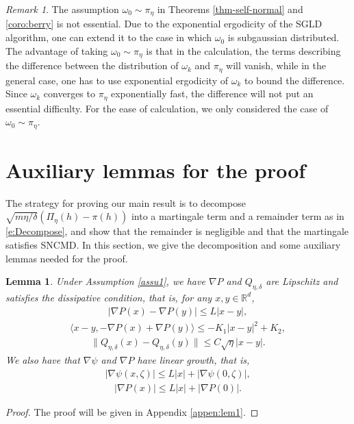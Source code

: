 \documentclass[12pt]{amsart}
\newtheorem{lemma}[theorem]{Lemma}
\theoremstyle{definition}
\theoremstyle{remark}
\newtheorem{remark}[theorem]{Remark}
\numberwithin{equation}{section}
\newcommand{\Ll}{\langle}
\newcommand{\Rr}{\rangle}
\newcommand{\R}{\mathbb{R}}\newcommand{\RR}{\mathbb{R}}
\begin{document}
\begin{remark}
The assumption $\omega_0\sim\pi_\eta$ in Theorems \ref{thm-self-normal} and \ref{coro:berry} is not essential. Due to the exponential ergodicity of the SGLD algorithm, one can extend it to the case in which $\omega_0$ is subgaussian distributed. The advantage of taking $\omega_0\sim\pi_\eta$ is that in the calculation, the terms describing the difference between the distribution of $\omega_k$ and $\pi_\eta$ will vanish, while in the general case, one has to use exponential ergodicity of $\omega_k$ to bound the difference. Since $\omega_k$ converges to $\pi_\eta$ exponentially fast, the difference will not put an essential difficulty. For the ease of calculation, we only considered the case of $\omega_0\sim\pi_\eta$.
\end{remark}



\section{Auxiliary lemmas for the proof}\label{sec:3}

The strategy for proving our main result is to decompose $\sqrt{m\eta/\delta}(\Pi_\eta(h)-\pi(h))$ into a martingale term and a remainder term as in \eqref{e:Decompose}, and show that the remainder is negligible and that the martingale satisfies SNCMD. In this section, we give the decomposition and some auxiliary lemmas needed for the proof. 



\begin{lemma}\label{lem:1} 
	Under Assumption \ref{assu1}, we have $\nabla P$ and $Q_{\eta,\delta}$ are Lipschitz and satisfies the dissipative condition, that is,  for any $x,y\in \R^d$,
		\begin{eqnarray}\label{e:plip}
		|\nabla P(x)-\nabla P(y)|\le L|x-y|,
	\end{eqnarray}
	\begin{eqnarray}\label{e:pdissi}
		\Ll x-y,-\nabla P(x)+\nabla P(y)\Rr\le -K_1|x-y|^2+K_2,
	\end{eqnarray}
	\begin{eqnarray}\label{e:qlip}
	\|Q_{\eta,\delta}(x)-Q_{\eta,\delta}(y)\|\le C\sqrt \eta |x-y|.
\end{eqnarray}
We also have that $\nabla \psi$ and $\nabla P$ have linear growth, that is, 
		\begin{eqnarray}\label{e:psibound1}
		|\nabla\psi(x,\zeta)|\le L|x|+|\nabla\psi(0,\zeta)|,
	\end{eqnarray} 
	\begin{eqnarray}\label{e:pbound1}
		|\nabla P(x)|\le L|x|+|\nabla P(0)|.
	\end{eqnarray}
\end{lemma}
\begin{proof}
	The proof will be given in Appendix \ref{appen:lem1}.	
\end{proof}
\end{document}
